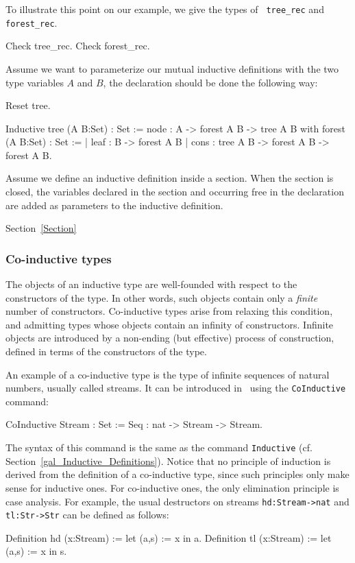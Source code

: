 To illustrate this point on our example, we give the types of {\tt
  tree\_rec} and {\tt forest\_rec}.

\begin{coq_example}
Check tree_rec.
Check forest_rec.
\end{coq_example}

Assume we want to parameterize our mutual inductive definitions with
the two type variables $A$ and $B$, the declaration should be done the
following way:

\begin{coq_eval}
Reset tree.
\end{coq_eval}
\begin{coq_example*}
Inductive tree (A B:Set) : Set :=
    node : A -> forest A B -> tree A B
with forest (A B:Set) : Set :=
  | leaf : B -> forest A B
  | cons : tree A B -> forest A B -> forest A B.
\end{coq_example*}

Assume we define an inductive definition inside a section.  When the
section is closed, the variables declared in the section and occurring
free in the declaration are added as parameters to the inductive
definition. 

\SeeAlso Section~\ref{Section}

\subsubsection{Co-inductive types
\label{CoInductiveTypes}
}

The objects of an inductive type are well-founded with respect to the
constructors of the type. In other words, such objects contain only a
{\it finite} number of constructors. Co-inductive types arise from
relaxing this condition, and admitting types whose objects contain an
infinity of constructors. Infinite objects are introduced by a
non-ending (but effective) process of construction, defined in terms
of the constructors of the type.

An example of a co-inductive type is the type of infinite sequences of
natural numbers, usually called streams. It can be introduced in \Coq\
using the \texttt{CoInductive} command:
\begin{coq_example}
CoInductive Stream : Set :=
    Seq : nat -> Stream -> Stream.
\end{coq_example}

The syntax of this command is the same as the command \texttt{Inductive}
(cf. Section~\ref{gal_Inductive_Definitions}). Notice that no
principle of induction is derived from the definition of a
co-inductive type, since such principles only make sense for inductive
ones. For co-inductive ones, the only elimination principle is case
analysis. For example, the usual destructors on streams
\texttt{hd:Stream->nat} and \texttt{tl:Str->Str} can be defined as
follows:
\begin{coq_example}
Definition hd (x:Stream) := let (a,s) := x in a.
Definition tl (x:Stream) := let (a,s) := x in s.
\end{coq_example}

